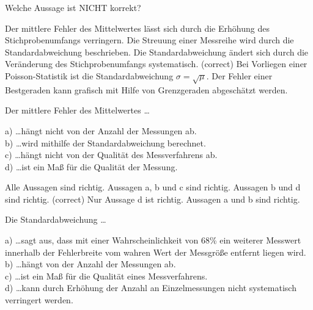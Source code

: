 \documentclass[11pt]{exam}
\begin{document}
\setlength{\voffset}{-0.5in}
\setlength{\headsep}{5pt}

\hspace{2mm}
 \hspace{5mm}
\vspace{4mm}

\begin{questions}


\question Welche Aussage ist NICHT korrekt? \\

\begin{choices}
	\choice Der mittlere Fehler des Mittelwertes lässt sich durch die Erhöhung des Stichprobenumfangs verringern.
	\choice Die Streuung einer Messreihe wird durch die Standardabweichung beschrieben.
	\choice Die Standardabweichung ändert sich durch die Veränderung des Stichprobenumfangs systematisch. (correct)
	\choice Bei Vorliegen einer Poisson-Statistik ist die Standardabweichung \( \sigma = \sqrt{\mu} \).
	\choice Der Fehler einer Bestgeraden kann grafisch mit Hilfe von Grenzgeraden abgeschätzt werden.
\end{choices}

\vspace{12mm}\question Der mittlere Fehler des Mittelwertes \dots

a) \dots hängt nicht von der Anzahl der Messungen ab. \\
b) \dots wird mithilfe der Standardabweichung berechnet.\\
c) \dots hängt nicht von der Qualität des Messverfahrens ab.\\
d) \dots ist ein Maß für die Qualität der Messung.\\


\begin{choices}
	\choice Alle Aussagen sind richtig.
	\choice Aussagen a, b und c sind richtig.
	\choice Aussagen b und d sind richtig. (correct)
	\choice Nur Aussage d ist richtig.
	\choice Aussagen a und b sind richtig.
\end{choices}

\vspace{12mm}\question Die Standardabweichung \dots 

a) \dots sagt aus, dass mit einer Wahrscheinlichkeit von 68\% ein weiterer Messwert innerhalb der Fehlerbreite vom wahren Wert der Messgröße entfernt liegen wird. \\
b) \dots hängt von der Anzahl der Messungen ab. \\
c) \dots ist ein Maß für die Qualität eines Messverfahrens. \\
d) \dots kann durch Erhöhung der Anzahl an Einzelmessungen nicht systematisch verringert werden.\\


\end{questions}
\end{document}
